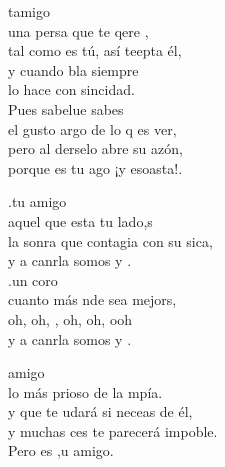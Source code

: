 \begin{cancion}[Es tu amigo es][Kairoi]%
	 tamigo  \\
	una persa que te qere , \\
	tal como es tú, así teepta él, \\
	y cuando bla siempre \\
	lo hace con sincidad.\\
	Pues sabelue sabes \\
	el gusto argo de lo q es ver,\\
	pero al derselo abre su azón, \\
	porque es tu ago ¡y esoasta!.\jump\\
	\begin{chorus}%
		.tu amigo   \\
		aquel que esta tu lado,s \\
		la sonra que contagia con su sica,\\
		y a canrla somos  y .\\
		.un coro   \\
		cuanto más nde sea mejors, \\
		oh, oh, , oh, oh,  ooh \\
		y a canrla somos  y . \jump\\
	\end{chorus}%
	  amigo  \\
	lo más prioso de la mpía. \\
	y que te udará si neceas de él,\\
	y muchas ces te parecerá impoble.\\
	Pero es ,u amigo. \\

\end{cancion}
